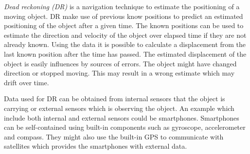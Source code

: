 \textit{Dead reckoning (DR)} \cite{DR} is a navigation technique to estimate the positioning of a moving object.
DR make use of previous know positions to predict an estimated positioning of the object after a given time.
The known positions can be used to estimate the direction and velocity of the object over elapsed time if they are not already known.
Using the data it is possible to calculate a displacement from the last known position after the time has passed.
The estimated displacement of the object is easily influences by sources of errors.
The object might have changed direction or stopped moving.
This may result in a wrong estimate which may drift over time.

Data used for DR can be obtained from internal sensors that the object is carrying or external sensors which is observing the object.
An example which include both internal and external sensors could be smartphones.
Smartphones can be self-contained using built-in components such as gyroscope, accelerometer and compass.
They might also use the built-in GPS to communicate with satellites which provides the smartphones with external data.